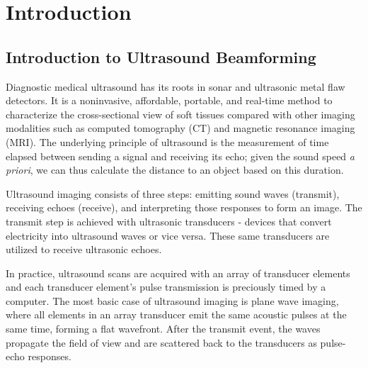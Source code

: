 \chapter{Introduction}


\section{Introduction to Ultrasound Beamforming}
 Diagnostic medical ultrasound has its roots in sonar and ultrasonic metal flaw detectors. It is a noninvasive, affordable, portable, and real-time method to characterize the cross-sectional view of soft tissues compared with other imaging modalities such as computed tomography (CT) and magnetic resonance imaging (MRI). The underlying principle of ultrasound is the measurement of time elapsed between sending a signal and receiving its echo; given the sound speed \textit{a priori}, we can thus calculate the distance to an object based on this duration.

 Ultrasound imaging consists of three steps: emitting sound waves (transmit), receiving echoes (receive), and interpreting those responses to form an image. The transmit step is achieved with ultrasonic transducers - devices that convert electricity into ultrasound waves or vice versa. These same transducers are utilized to receive ultrasonic echoes.

 In practice, ultrasound scans are acquired with an array of transducer elements and each transducer element's pulse transmission is preciously timed by a computer. The most basic case of ultrasound imaging is plane wave imaging, where all elements in an array transducer emit the same acoustic pulses at the same time, forming a flat wavefront. After the transmit event, the waves propagate the field of view and are scattered back to the transducers as pulse-echo responses.



